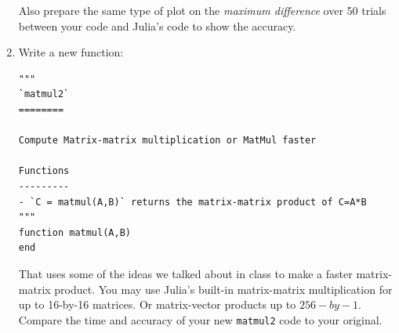 \documentclass[]{article}
\begin{document}
\begin{enumerate}
  Also prepare the same type of plot on the \emph{maximum difference}
  over 50 trials between your code and Julia's code to show the
  accuracy.
\item
  Write a new function:

\begin{verbatim}
"""
`matmul2`
========

Compute Matrix-matrix multiplication or MatMul faster

Functions
---------
- `C = matmul(A,B)` returns the matrix-matrix product of C=A*B
"""
function matmul(A,B)        
end
\end{verbatim}

  That uses some of the ideas we talked about in class to make a faster
  matrix-matrix product. You may use Julia's built-in matrix-matrix
  multiplication for up to 16-by-16 matrices. Or matrix-vector products
  up to \(256-by-1\). Compare the time and accuracy of your new
  \texttt{matmul2} code to your original.
\end{enumerate}
\end{document}

